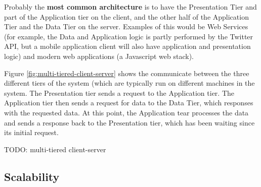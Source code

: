 \documentclass{article}
\begin{document}
Probably the \textbf{most common architecture} is to have the Presentation Tier and part of the Application tier on the client, and the other half of the Application Tier and the Data Tier on the server. Examples of this would be Web Services (for example, the Data and Application logic is partly performed by the Twitter API, but a mobile application client will also have application and presentation logic) and modern web applications (a Javascript web stack).

Figure \ref{fig:multi-tiered-client-server} shows the communicate between the three different tiers of the system (which are typically run on different machines in the system. The Presentation tier sends a request to the Application tier. The Application tier then sends a request for data to the Data Tier, which responses with the requested data. At this point, the Application tear processes the data and sends a response back to the Presentation tier, which has been waiting since its initial request.

TODO: multi-tiered client-server

\subsection{Scalability}
\end{document}
